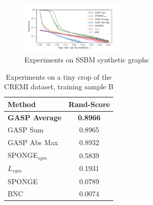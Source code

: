 \begin{figure}
\centering
        \includegraphics[width=0.45\textwidth,trim=0.25in 0.25in 0.68in 0.36in,clip]{./figs/SSBM_experiments.pdf}
        \caption{Experiments on SSBM synthetic graphs }
    \label{fig:SSBM_spectral_experiments}
\end{figure}
\begin{table}
\centering
\begin{tabular}{l|c}
           Method & Rand-Score \\ \midrule
           \textbf{GASP Average} & \textbf{0.8966} \\
GASP Sum & 0.8965 \\
GASP Abs Max & 0.8932 \\
SPONGE$_{sym}$ \cite{Cucuringu2019SPONGEAG} & 0.5839\\
$L_{sym}$ \cite{kunegis2010spectral} & 0.1931 \\
SPONGE \cite{Cucuringu2019SPONGEAG} & 0.0789 \\
BNC \cite{chiang2012scalable} & 0.0074 \\
        \end{tabular}
    \caption{Experiments on a tiny crop of the CREMI dataset, training sample B }
    \label{tab:cremi_spectral_experiments}
\end{table}
